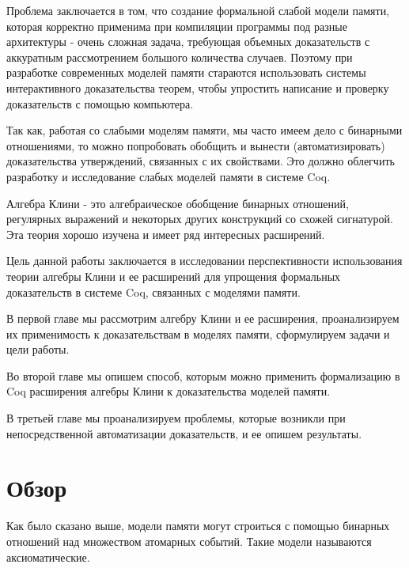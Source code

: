 \documentclass[times
              ]{itmo-student-thesis}
\begin{document}
Проблема заключается в том, что создание формальной слабой модели памяти, которая корректно применима
при компиляции программы под разные архитектуры - очень сложная задача, требующая объемных
доказательств с аккуратным рассмотрением большого количества случаев.
Поэтому при разработке современных моделей памяти стараются использовать системы интерактивного
доказательства теорем\cite{rc11}, чтобы упростить написание и проверку доказательств с помощью
компьютера.

Так как, работая со слабыми моделям памяти, мы часто имеем дело с бинарными отношениями, то можно
попробовать обобщить и вынести (автоматизировать) доказательства утверждений, связанных с их свойствами.
Это должно облегчить разработку и исследование слабых моделей памяти в системе Coq.

Алгебра Клини - это алгебраическое обобщение бинарных отношений, регулярных выражений и некоторых
других конструкций со схожей сигнатурой.
Эта теория хорошо изучена и имеет ряд интересных расширений.

Цель данной работы заключается в исследовании перспективности использования теории алгебры Клини и ее
расширений для упрощения формальных доказательств в системе Coq, связанных с моделями памяти.


В первой главе мы рассмотрим алгебру Клини и ее расширения, проанализируем их применимость к
доказательствам в моделях памяти, сформулируем задачи и цели работы.

Во второй главе мы опишем способ, которым можно применить формализацию в Coq расширения алгебры Клини к
доказательства моделей памяти.

В третьей главе мы проанализируем проблемы, которые возникли при непосредственной автоматизации
доказательств, и ее опишем результаты.

\chapter{Обзор}
\startrelatedwork

  Как было сказано выше, модели памяти могут строиться с помощью бинарных отношений над множеством
  атомарных событий. Такие модели называются аксиоматические\cite{axiomatic_memory_model_for_power_mp}.
\end{document}
